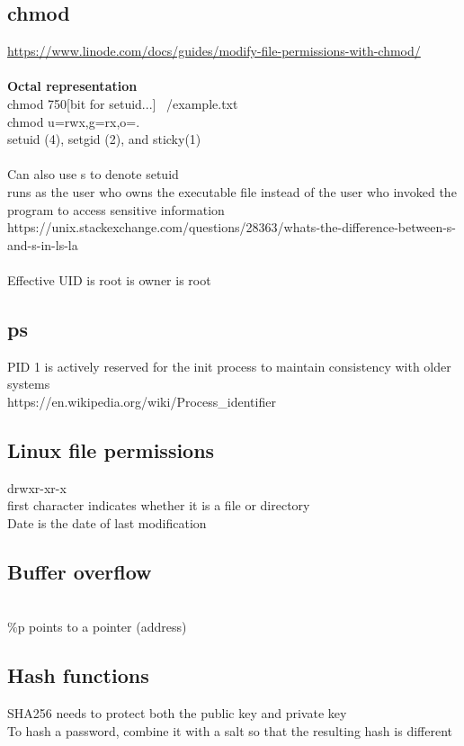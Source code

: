\documentclass[11pt]{article}
\begin{document}
\begin{multicols*}{3}
\subsection*{chmod}
\textcolor{link}{\url{https://www.linode.com/docs/guides/modify-file-permissions-with-chmod/}}\\\\
\textbf{Octal representation}\\
chmod 750[bit for setuid...] ~/example.txt\\
chmod u=rwx,g=rx,o=.\\
setuid (4), setgid (2), and sticky(1)\\
\\
Can also use s to denote setuid\\
runs as the user who owns the executable file instead of the user who invoked the program to access sensitive information\\
\textcolor{link}{https://unix.stackexchange.com/questions/28363/whats-the-difference-between-s-and-s-in-ls-la}\\\\
Effective UID is root is owner is root
\subsection*{ps}
PID 1 is actively reserved for the init process to maintain consistency with older systems\\
\textcolor{link}{https://en.wikipedia.org/wiki/Process\_identifier}\\
\subsection*{Linux file permissions}
drwxr-xr-x\\
first character indicates whether it is a file or directory\\
Date is the date of last modification
\subsection*{Buffer overflow}\\
\%p points to a pointer (address)\\
\subsection*{Hash functions}
SHA256 needs to protect both the public key and private key\\
To hash a password, combine it with a salt so that the resulting hash is different

\end{multicols*}
\end{document}
